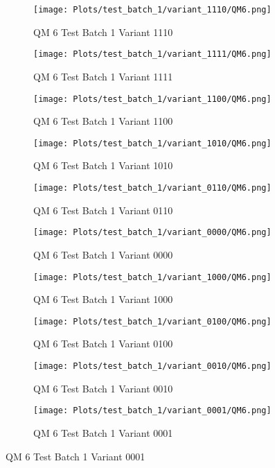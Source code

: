 \documentclass{DissertateFigs}
\begin{document}
\begin{figure}[t!]
    \begin{subfigure}{0.47\textwidth}
    \texttt{[image: Plots/test\_batch\_1/variant\_1110/QM6.png]}
    \caption{QM 6 Test Batch 1 Variant 1110}
    \end{subfigure}
    \begin{subfigure}{0.47\textwidth}
    \texttt{[image: Plots/test\_batch\_1/variant\_1111/QM6.png]}
    \caption{QM 6 Test Batch 1 Variant 1111}
    \end{subfigure}

\medskip

    \begin{subfigure}{0.47\textwidth}
    \texttt{[image: Plots/test\_batch\_1/variant\_1100/QM6.png]}
    \caption{QM 6 Test Batch 1 Variant 1100}
    \end{subfigure}
    \begin{subfigure}{0.47\textwidth}
    \texttt{[image: Plots/test\_batch\_1/variant\_1010/QM6.png]}
    \caption{QM 6 Test Batch 1 Variant 1010}
    \end{subfigure}

\medskip

    \begin{subfigure}{0.47\textwidth}
    \texttt{[image: Plots/test\_batch\_1/variant\_0110/QM6.png]}
    \caption{QM 6 Test Batch 1 Variant 0110}
    \end{subfigure}
    \begin{subfigure}{0.47\textwidth}
    \texttt{[image: Plots/test\_batch\_1/variant\_0000/QM6.png]}
    \caption{QM 6 Test Batch 1 Variant 0000}
    \end{subfigure}

\medskip

    \begin{subfigure}{0.47\textwidth}
    \texttt{[image: Plots/test\_batch\_1/variant\_1000/QM6.png]}
    \caption{QM 6 Test Batch 1 Variant 1000}
    \end{subfigure}
    \begin{subfigure}{0.47\textwidth}
    \texttt{[image: Plots/test\_batch\_1/variant\_0100/QM6.png]}
    \caption{QM 6 Test Batch 1 Variant 0100}
    \end{subfigure}

\medskip

    \begin{subfigure}{0.47\textwidth}
    \texttt{[image: Plots/test\_batch\_1/variant\_0010/QM6.png]}
    \caption{QM 6 Test Batch 1 Variant 0010}
    \end{subfigure}
    \begin{subfigure}{0.47\textwidth}
    \texttt{[image: Plots/test\_batch\_1/variant\_0001/QM6.png]}
    \caption{QM 6 Test Batch 1 Variant 0001}
    \end{subfigure}


\end{figure}
\end{document}
